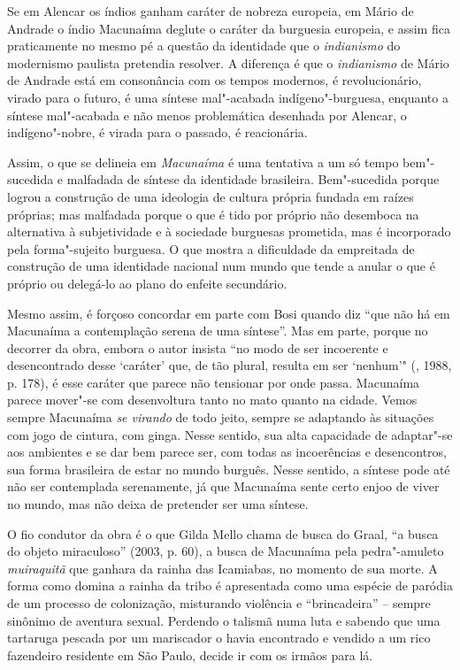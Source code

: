 Se em Alencar os índios ganham caráter de nobreza europeia, em Mário de
Andrade o índio Macunaíma deglute o caráter da burguesia europeia, e
assim fica praticamente no mesmo pé a questão da identidade que o
\emph{indianismo} do modernismo paulista pretendia resolver. A diferença
é que o \emph{indianismo} de Mário de Andrade está em consonância com os
tempos modernos, é revolucionário, virado para o futuro, é uma síntese
mal"-acabada indígeno"-burguesa, enquanto a síntese mal"-acabada e não
menos problemática desenhada por Alencar, o indígeno"-nobre, é virada
para o passado, é reacionária.

Assim, o que se delineia em \emph{Macunaíma} é uma tentativa a um só
tempo bem"-sucedida e malfadada de síntese da identidade brasileira.
Bem"-sucedida porque logrou a construção de uma ideologia de cultura
própria fundada em raízes próprias; mas malfadada porque o que é tido
por próprio não desemboca na alternativa à subjetividade e à sociedade
burguesas prometida, mas é incorporado pela forma"-sujeito burguesa. O
que mostra a dificuldade da empreitada de construção de uma identidade
nacional num mundo que tende a anular o que é próprio ou delegá-lo ao
plano do enfeite secundário.

Mesmo assim, é forçoso concordar em parte com Bosi quando diz ``que não
há em Macunaíma a contemplação serena de uma síntese''. Mas em parte, porque
no decorrer da obra, embora o autor insista ``no modo de ser incoerente
e desencontrado desse `caráter' que, de tão plural, resulta em ser
`nenhum'" (, 1988, p. 178), é esse caráter que parece não tensionar
por onde passa. Macunaíma parece mover"-se com desenvoltura tanto no mato
quanto na cidade. Vemos sempre Macunaíma \emph{se virando} de todo
jeito, sempre se adaptando às situações com jogo de cintura, com ginga.
Nesse sentido, sua alta capacidade de adaptar"-se aos ambientes e se dar
bem parece ser, com todas as incoerências e desencontros, sua forma
brasileira de estar no mundo burguês. Nesse sentido, a síntese pode até
não ser contemplada serenamente, já que Macunaíma sente certo enjoo de
viver no mundo, mas não deixa de pretender ser uma síntese.

O fio condutor da obra é o que Gilda Mello chama de busca do Graal, ``a
busca do objeto miraculoso'' (2003, p. 60), a busca de Macunaíma pela
pedra"-amuleto \emph{muiraquitã} que ganhara da rainha das Icamiabas, no
momento de sua morte. A forma como domina a rainha da tribo é
apresentada como uma espécie de paródia de um processo de colonização,
misturando violência e ``brincadeira'' -- sempre sinônimo de aventura
sexual. Perdendo o talismã numa luta e sabendo que uma tartaruga pescada
por um mariscador o havia encontrado e vendido a um rico fazendeiro
residente em São Paulo, decide ir com os irmãos para lá.


